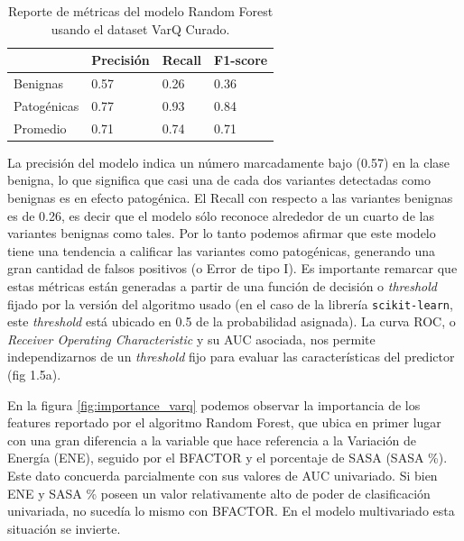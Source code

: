 \begin{table}[H]
\centering
\begin{tabular}{|l|l|l|l|}
\hline
              & Precisión & Recall & F1-score \\ \hline
Benignas      & 0.57      & 0.26   & 0.36     \\ \hline
Patogénicas   & 0.77      & 0.93   & 0.84     \\ \hline
Promedio      & 0.71      & 0.74   & 0.71     \\ \hline
\end{tabular}
\caption{Reporte de métricas del modelo Random Forest usando el dataset VarQ Curado.}
\label{tab:metrics_varq}
\end{table}

La precisión del modelo indica un número marcadamente bajo (0.57) en la clase benigna, lo que significa que casi una de cada dos variantes detectadas como benignas es en efecto patogénica. El Recall con respecto a las variantes benignas es de 0.26, es decir que el modelo sólo reconoce alrededor de un cuarto de las variantes benignas como tales. Por lo tanto podemos afirmar que este modelo tiene una tendencia a calificar las variantes como patogénicas, generando una gran cantidad de falsos positivos (o Error de tipo I). Es importante remarcar que estas métricas están generadas a partir de una función de decisión o \textit{threshold} fijado por la versión del algoritmo usado (en el caso de la librería \texttt{scikit-learn}, este \textit{threshold} está ubicado en 0.5 de la probabilidad asignada).  La curva ROC, o \textit{Receiver Operating Characteristic} y su AUC asociada, nos permite independizarnos de un \textit{threshold} fijo para evaluar las características del predictor (fig 1.5a).

En la figura \ref{fig:importance_varq} podemos observar la importancia de los features reportado por el algoritmo Random Forest, que ubica en primer lugar con una gran diferencia a la variable que hace referencia a la Variación de Energía (ENE), seguido por el BFACTOR y el porcentaje de SASA (SASA \%). Este dato concuerda parcialmente con sus valores de AUC univariado. Si bien ENE y SASA \% poseen un valor relativamente alto de poder de clasificación univariada, no sucedía lo mismo con BFACTOR. En el modelo multivariado esta situación se invierte.

\newpage

